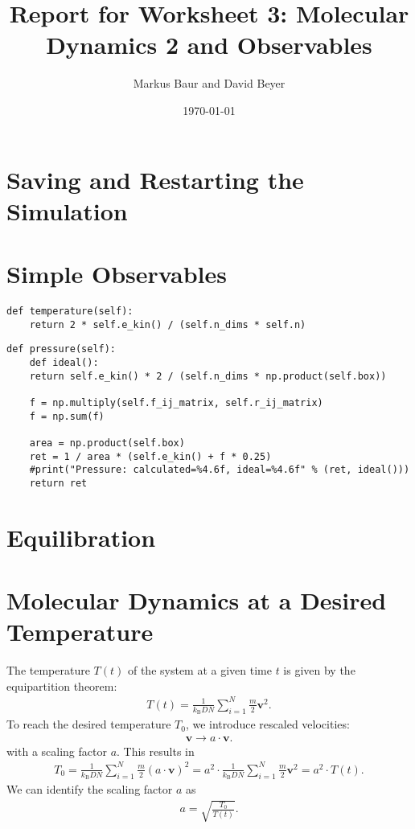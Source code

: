 \documentclass[a4paper,10pt,bibtotoc]{scrartcl}
\begin{document}
\titlehead{Simulation Methods in Physics I \hfill WS 2019/2010}
\title{Report for Worksheet 3: Molecular Dynamics 2 and Observables}
\author{Markus Baur and David Beyer}
\date{\today}
\maketitle

\tableofcontents

\section{Saving and Restarting the Simulation}
\section{Simple Observables}
\begin{lstlisting}
def temperature(self):
    return 2 * self.e_kin() / (self.n_dims * self.n)
\end{lstlisting}
\begin{lstlisting}
def pressure(self):
    def ideal():
    return self.e_kin() * 2 / (self.n_dims * np.product(self.box))
    
    f = np.multiply(self.f_ij_matrix, self.r_ij_matrix)
    f = np.sum(f)

    area = np.product(self.box)
    ret = 1 / area * (self.e_kin() + f * 0.25)
    #print("Pressure: calculated=%4.6f, ideal=%4.6f" % (ret, ideal()))
    return ret
\end{lstlisting}


\section{Equilibration}
\section{Molecular Dynamics at a Desired Temperature}
The temperature $T(t)$ of the system at a given time $t$ is given by the equipartition theorem:
\begin{align}
T(t) = \frac{1}{k_\mathrm{B}DN}\sum_{i=1}^{N}\frac{m}{2}\mathbf{v}^2.
\end{align}
To reach the desired temperature $T_0$, we introduce rescaled velocities:
\begin{align}
\mathbf{v}\rightarrow a\cdot\mathbf{v}.
\end{align}
with a scaling factor $a$. 
This results in
\begin{align}
T_0 = \frac{1}{k_\mathrm{B}DN}\sum_{i=1}^{N}\frac{m}{2}\left(a\cdot\mathbf{v}\right)^2 =a^2\cdot \frac{1}{k_\mathrm{B}DN}\sum_{i=1}^{N}\frac{m}{2}\mathbf{v}^2 = a^2\cdot T(t).
\end{align}
We can identify the scaling factor $a$ as
\begin{align}
a = \sqrt{\frac{T_0}{T(t)}}.
\end{align}
\end{document}

